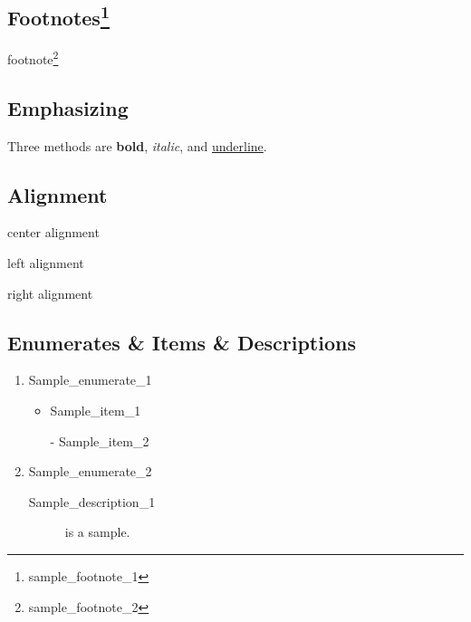 \documentclass[12pt, oneside]{article}
\begin{document}
\subsection{Footnotes\protect\footnote{sample\_footnote\_1}} 
footnote\footnote{sample\_footnote\_2}



\subsection{Emphasizing}
Three methods are \textbf{bold}, \emph{italic}, and \underline{underline}.



\subsection{Alignment}
\begin{center}
center alignment
\end{center}
\begin{flushleft}
left alignment
\end{flushleft}
\begin{flushright}
right alignment
\end{flushright}



\subsection{Enumerates \& Items \& Descriptions}

\begin{enumerate}
\item Sample\_enumerate\_1

\begin{itemize}
\item Sample\_item\_1
\item[-] Sample\_item\_2
\end{itemize}
\item Sample\_enumerate\_2

\begin{description}
\item [Sample\_description\_1] is a sample. %
\end{description}
\end{enumerate}
\end{document}
